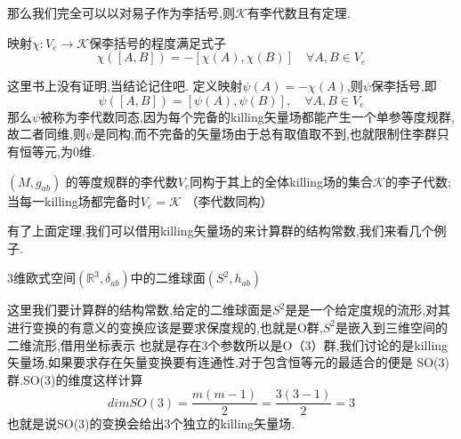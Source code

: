 \documentclass[../main.tex]{subfiles}
\begin{document}
那么我们完全可以以对易子作为李括号,则$\mathscr{K}$有李代数且有定理.\begin{theorem}
	映射$\chi:V_e \rightarrow \mathscr{K}$保李括号的程度满足式子$$
		\chi([A,B]) = -[\chi(A),\chi(B)]\quad \forall A,B \in V_e$$
\end{theorem}
这里书上没有证明,当结论记住吧.
定义映射$\psi (A) = - \chi(A)$,则$\psi$保李括号,即$$
	\psi([A,B]) = [\psi(A),\psi(B)],\quad \forall A,B \in V_e $$
那么$\psi$被称为李代数同态,因为每个完备的killing矢量场都能产生一个单参等度规群,故二者同维,则$\psi $是同构,而不完备的矢量场由于总有取值取不到,也就限制住李群只有恒等元,为0维.
\begin{theorem}
	$(M,g_{ab})$ 的等度规群的李代数$V_e$同构于其上的全体killing场的集合$\mathscr{K}$的李子代数;当每一killing场都完备时$V_e = \mathscr{K}$
	（李代数同构）
\end{theorem}
有了上面定理,我们可以借用killing矢量场的来计算群的结构常数,我们来看几个例子.
\begin{example}
	3维欧式空间$(\mathbb{R}^3,\delta_{ab})$中的二维球面$(S^2,h_{ab})$
\end{example}
这里我们要计算群的结构常数,给定的二维球面是$S^2 $是是一个给定度规的流形,对其进行变换的有意义的变换应该是要求保度规的,也就是O群,$S^2 $是嵌入到三维空间的二维流形,借用坐标表示
也就是存在3个参数所以是O（3）群,我们讨论的是killing矢量场,如果要求存在矢量变换要有连通性,对于包含恒等元的最适合的便是
SO(3)群.SO(3)的维度这样计算$$
	dim SO(3) = \frac{m(m-1)}{2}=\frac{3(3-1)}{2}= 3$$
也就是说SO(3)的变换会给出3个独立的killing矢量场.
\end{document}
